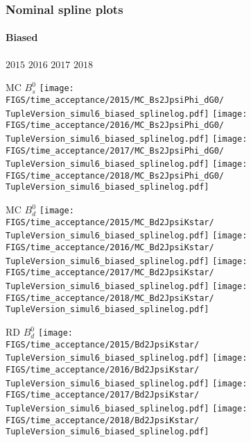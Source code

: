 \begin{frame} %
\frametitle{Nominal spline plots}
\framesubtitle{Biased}

  \phantom{2020} \hspace*{1.5cm} $2015$ \hspace*{1.5cm} $2016$ \hspace*{1.5cm} $2017$ \hspace*{1.5cm} $2018$

  MC $B_s^0$
  \texttt{[image: \\FIGS/time\_acceptance/2015/MC\_Bs2JpsiPhi\_dG0/\\TupleVersion\_simul6\_biased\_splinelog.pdf]}
  \texttt{[image: \\FIGS/time\_acceptance/2016/MC\_Bs2JpsiPhi\_dG0/\\TupleVersion\_simul6\_biased\_splinelog.pdf]}
  \texttt{[image: \\FIGS/time\_acceptance/2017/MC\_Bs2JpsiPhi\_dG0/\\TupleVersion\_simul6\_biased\_splinelog.pdf]}
  \texttt{[image: \\FIGS/time\_acceptance/2018/MC\_Bs2JpsiPhi\_dG0/\\TupleVersion\_simul6\_biased\_splinelog.pdf]}
  \vspace*{2mm}

  MC $B_d^0$
  \texttt{[image: \\FIGS/time\_acceptance/2015/MC\_Bd2JpsiKstar/\\TupleVersion\_simul6\_biased\_splinelog.pdf]}
  \texttt{[image: \\FIGS/time\_acceptance/2016/MC\_Bd2JpsiKstar/\\TupleVersion\_simul6\_biased\_splinelog.pdf]}
  \texttt{[image: \\FIGS/time\_acceptance/2017/MC\_Bd2JpsiKstar/\\TupleVersion\_simul6\_biased\_splinelog.pdf]}
  \texttt{[image: \\FIGS/time\_acceptance/2018/MC\_Bd2JpsiKstar/\\TupleVersion\_simul6\_biased\_splinelog.pdf]}
  \vspace*{2mm}

  RD $B_d^0$
  \texttt{[image: \\FIGS/time\_acceptance/2015/Bd2JpsiKstar/\\TupleVersion\_simul6\_biased\_splinelog.pdf]}
  \texttt{[image: \\FIGS/time\_acceptance/2016/Bd2JpsiKstar/\\TupleVersion\_simul6\_biased\_splinelog.pdf]}
  \texttt{[image: \\FIGS/time\_acceptance/2017/Bd2JpsiKstar/\\TupleVersion\_simul6\_biased\_splinelog.pdf]}
  \texttt{[image: \\FIGS/time\_acceptance/2018/Bd2JpsiKstar/\\TupleVersion\_simul6\_biased\_splinelog.pdf]}

\end{frame} %



